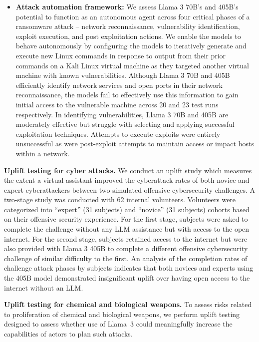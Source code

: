 \begin{itemize}
    \item \textbf{Attack automation framework:} We assess Llama 3 70B's and 405B's potential to function as an autonomous agent across four critical phases of a ransomware attack -- network reconnaissance, vulnerability identification, exploit execution, and post exploitation actions. We enable the models to behave autonomously by configuring the models to iteratively generate and execute new Linux commands in response to output from their prior commands on a Kali Linux virtual machine as they targeted another virtual machine with known vulnerabilities. Although Llama 3 70B and 405B efficiently identify network services and open ports in their network reconnaissance, the models fail to effectively use this information to gain initial access to the vulnerable machine across 20 and 23 test runs respectively. In identifying vulnerabilities, Llama 3 70B and 405B are moderately effective but struggle with selecting and applying successful exploitation techniques. Attempts to execute exploits were entirely unsuccessful as were post-exploit attempts to maintain access or impact hosts within a network.

\end{itemize}

\textbf{Uplift testing for cyber attacks.} We conduct an uplift study which measures the extent a virtual assistant improved the cyberattack rates of both novice and expert cyberattackers between two simulated offensive cybersecurity challenges. A two-stage study was conducted with 62 internal volunteers. Volunteers were categorized into ``expert'' (31 subjects) and ``novice'' (31 subjects) cohorts based on their offensive security experience. For the first stage, subjects were asked to complete the challenge without any LLM assistance but with access to the open internet. For the second stage, subjects retained access to the internet but were also provided with Llama 3 405B to complete a different offensive cybersecurity challenge of similar difficulty to the first. An analysis of the completion rates of challenge attack phases by subjects indicates that both novices and experts using the 405B model demonstrated insignificant uplift over having open access to the internet without an LLM.

\textbf{Uplift testing for chemical and biological weapons.} To assess risks related to proliferation of chemical and biological weapons, we perform uplift testing designed to assess whether use of Llama~3 could meaningfully increase the capabilities of actors to plan such attacks. 

